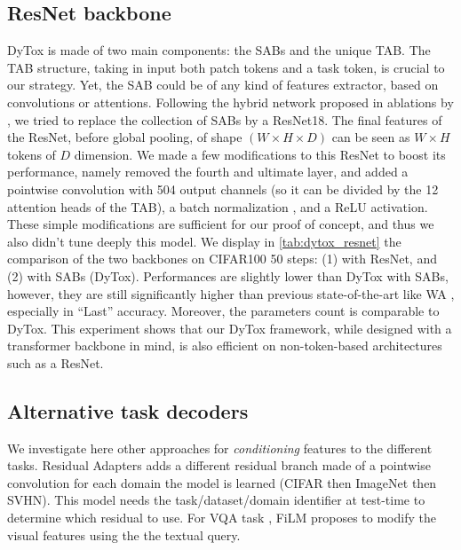 

%   

\subsection{ResNet backbone}

DyTox is made of two main components: the SABs and the unique TAB. The TAB structure, taking in
input both patch tokens and a task token, is crucial to our strategy. Yet, the SAB could be of any
kind of features extractor, based on convolutions or attentions. Following the hybrid network
proposed in ablations by \citet{dosovitskiy2020vit}, we tried to replace the
collection of SABs by a ResNet18. The final features of the ResNet, before global pooling, of shape
$(W \times H \times D)$ can be seen as $W \times H$ tokens of $D$ dimension. We made a few
modifications to this ResNet to boost its performance, namely removed the fourth and ultimate layer,
and added a pointwise convolution with 504 output channels (so it can be divided by the 12 attention
heads of the TAB), a batch normalization \citep{ioffe2015batchnorm}, and a ReLU activation. These
simple modifications are sufficient for our proof of concept, and thus we also didn't tune deeply
this model. We display in \autoref{tab:dytox_resnet} the comparison of the two backbones on CIFAR100 50
steps: (1) with ResNet, and (2) with SABs (DyTox). Performances are slightly lower than DyTox with
SABs, however, they are still significantly higher than previous state-of-the-art like WA
\citep{zhao2020weightalignement}, especially in ``Last'' accuracy. Moreover, the parameters count is
comparable to DyTox. This experiment shows that our DyTox framework, while designed with a
transformer backbone in mind, is also efficient on non-token-based architectures such as a ResNet.



\subsection{Alternative task decoders}

We investigate here other approaches for \textit{conditioning} features to the different tasks.
Residual Adapters \citep{rebuffi2017residualadapters} adds a different residual branch made of a
pointwise convolution for each domain the model is learned (\eg CIFAR then ImageNet then SVHN). This
model needs the task/dataset/domain identifier at test-time to determine which residual to use. For
VQA task \citep{antol2015vqa}, FiLM \citep{perez2018film} proposes to modify the visual features using
the the textual query.

